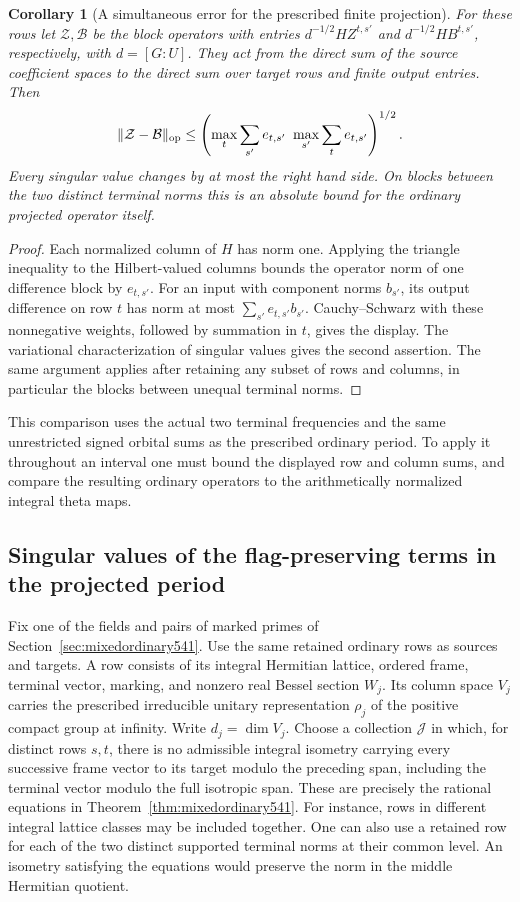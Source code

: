 \documentclass[a4paper,11pt]{article}
\newtheorem{corollary}[proposition]{Corollary}
\theoremstyle{definition}
\theoremstyle{remark}
\numberwithin{equation}{section}
\begin{document}
\begin{corollary}[A simultaneous error for the prescribed finite projection]
\leavevmode\label{cor:mixedmatrix541}
For these rows let \(\mathcal Z,\mathcal B\) be the block
operators with entries \(d^{-1/2}HZ^{t,s'}\) and
\(d^{-1/2}HB^{t,s'}\), respectively, with \(d=[G:U]\).
They act from the direct sum of the source coefficient spaces
to the direct sum over target rows and finite output entries.
Then
\[
 \|\mathcal Z-\mathcal B\|_{\rm op}
 \le
 \left(\max_t\sum_{s'}e_{t,s'}\ 
                  \max_{s'}\sum_t e_{t,s'}\right)^{1/2}.
\]
Every singular value changes by at most the right hand side.
On blocks between the two distinct terminal norms this is an
absolute bound for the ordinary projected operator itself.
\end{corollary}
\begin{proof}
Each normalized column of \(H\) has norm one. Applying the
triangle inequality to the Hilbert-valued columns bounds the
operator norm of one difference block by \(e_{t,s'}\).
For an input with component norms \(b_{s'}\), its output
difference on row \(t\) has norm at most
\(\sum_{s'}e_{t,s'}b_{s'}\). Cauchy--Schwarz with these
nonnegative weights, followed by summation in \(t\), gives the
display. The variational characterization of singular values
gives the second assertion. The same argument applies after
retaining any subset of rows and columns, in particular the
blocks between unequal terminal norms.
\end{proof}

This comparison uses the actual two terminal frequencies and the
same unrestricted signed orbital sums as the prescribed ordinary
period. To apply it throughout an interval one must bound the
displayed row and column sums, and compare the resulting ordinary
operators to the arithmetically normalized integral theta maps.


\subsection{Singular values of the flag-preserving terms in the projected period}
\label{sec:flagsingular544}

Fix one of the fields and pairs of marked primes of
Section~\ref{sec:mixedordinary541}. Use the same retained ordinary
rows as sources and targets. A row consists of its integral
Hermitian lattice, ordered frame, terminal vector, marking, and
nonzero real Bessel section \(W_j\). Its column space \(V_j\)
carries the prescribed irreducible unitary representation \(\rho_j\)
of the positive compact group at infinity. Write \(d_j=\dim V_j\).
Choose a collection \(\mathcal J\) in which, for distinct rows
\(s,t\), there is no admissible integral isometry carrying every
successive frame vector to its target modulo the preceding span,
including the terminal vector modulo the full isotropic span.
These are precisely the rational equations in
Theorem~\ref{thm:mixedordinary541}. For instance, rows in different
integral lattice classes may be included together. One can also
use a retained row for each of the two distinct supported terminal
norms at their common level. An isometry satisfying the equations
would preserve the norm in the middle Hermitian quotient.
\end{document}
